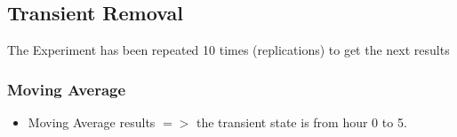 \documentclass[aps,letterpaper,10pt]{revtex4}
\begin{document}
    \newpage
    \subsection{Transient Removal}
        The Experiment has been repeated 10 times (replications) to get the next results
        \subsubsection{Moving Average}
            \begin{itemize}
                \item Moving Average results $=>$ the transient state is from hour 0 to 5.
            \end{itemize}
            
            \begin{figure}[htp]
                \begin{center}
                \end{center}
            \end{figure}
        \newpage
\end{document}
